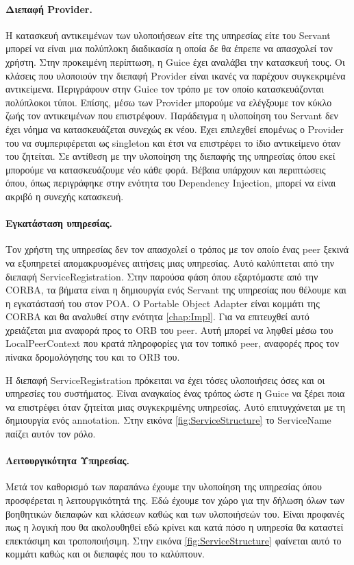 \paragraph{Διεπαφή Provider.} Η κατασκευή αντικειμένων των υλοποιήσεων είτε 
της υπηρεσίας είτε του Servant μπορεί να είναι μια πολύπλοκη διαδικασία 
η οποία δε θα έπρεπε να απασχολεί τον χρήστη. Στην προκειμένη περίπτωση, 
η Guice έχει αναλάβει την κατασκευή τους. Οι κλάσεις που υλοποιούν την 
διεπαφή Provider είναι ικανές να παρέχουν συγκεκριμένα αντικείμενα. 
Περιγράφουν στην Guice τον τρόπο με τον οποίο κατασκευάζονται πολύπλοκοι 
τύποι. Επίσης, μέσω των Provider μπορούμε να ελέγξουμε τον κύκλο ζωής 
τον αντικειμένων που επιστρέφουν. Παράδειγμα η υλοποίηση του Servant δεν 
έχει νόημα να κατασκευάζεται συνεχώς εκ νέου. Έχει επιλεχθεί επομένως ο 
Provider του να συμπεριφέρεται ως singleton και έτσι να επιστρέφει το 
ίδιο αντικείμενο όταν του ζητείται. Σε αντίθεση με την υλοποίηση της 
διεπαφής της υπηρεσίας όπου εκεί μπορούμε να κατασκευάζουμε νέο κάθε 
φορά. Βέβαια υπάρχουν και περιπτώσεις όπου, όπως περιγράφηκε στην 
ενότητα του Dependency Injection, μπορεί να είναι ακριβό η συνεχής 
κατασκευή.

\paragraph{Εγκατάσταση υπηρεσίας.} Τον χρήστη της υπηρεσίας δεν τον 
απασχολεί ο τρόπος με τον οποίο ένας peer ξεκινά να εξυπηρετεί 
απομακρυσμένες αιτήσεις μιας υπηρεσίας. Αυτό καλύπτεται από την διεπαφή 
ServiceRegistration. Στην παρούσα φάση όπου εξαρτόμαστε από την CORBA, 
τα βήματα είναι η δημιουργία ενός Servant της υπηρεσίας που θέλουμε και 
η εγκατάστασή του στον POA. Ο Portable Object Adapter είναι κομμάτι της 
CORBA και θα αναλυθεί στην ενότητα \ref{chap:Impl}. Για να επιτευχθεί 
αυτό χρειάζεται μια αναφορά προς το ORB του peer. Αυτή μπορεί να ληφθεί 
μέσω του LocalPeerContext που κρατά πληροφορίες για τον τοπικό peer, 
αναφορές προς τον πίνακα δρομολόγησης του και το ORB του.

Η διεπαφή ServiceRegistration πρόκειται να έχει τόσες υλοποιήσεις όσες 
και οι υπηρεσίες του συστήματος. Είναι αναγκαίος ένας τρόπος ώστε η 
Guice να ξέρει ποια να επιστρέφει όταν ζητείται μιας συγκεκριμένης 
υπηρεσίας. Αυτό επιτυγχάνεται με τη δημιουργία ενός annotation. Στην 
εικόνα \ref{fig:ServiceStructure} το ServiceName παίζει αυτόν τον ρόλο.

\paragraph{Λειτουργικότητα Υπηρεσίας.} Μετά τον καθορισμό των παραπάνω 
έχουμε την υλοποίηση της υπηρεσίας όπου προσφέρεται η λειτουργικότητά της. 
Εδώ έχουμε τον χώρο για την δήλωση όλων των βοηθητικών διεπαφών και κλάσεων 
καθώς και των υλοποιήσεών του. Είναι προφανές πως η λογική που θα 
ακολουθηθεί εδώ κρίνει και κατά πόσο η υπηρεσία θα καταστεί επεκτάσιμη 
και τροποποιήσιμη. Στην εικόνα \ref{fig:ServiceStructure} φαίνεται αυτό 
το κομμάτι καθώς και οι διεπαφές που το καλύπτουν.

